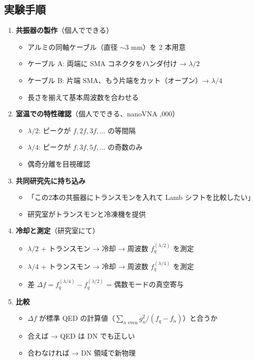 \documentclass[12pt,a4paper]{article}
\begin{document}
\subsection{実験手順}
\begin{expbox}[ステップバイステップ]
\begin{enumerate}
\item \textbf{共振器の製作}（個人でできる）
  \begin{itemize}
  \item アルミの同軸ケーブル（直径 $\sim$3 mm）を 2 本用意
  \item ケーブル A: 両端に SMA コネクタをハンダ付け → $\lambda/2$
  \item ケーブル B: 片端 SMA、もう片端をカット（オープン）→ $\lambda/4$
  \item 長さを揃えて基本周波数を合わせる
  \end{itemize}

\item \textbf{室温での特性確認}（個人でできる、nanoVNA ,000）
  \begin{itemize}
  \item $\lambda/2$: ピークが $f, 2f, 3f, \ldots$ の等間隔
  \item $\lambda/4$: ピークが $f, 3f, 5f, \ldots$ の奇数のみ
  \item 偶奇分離を目視確認
  \end{itemize}

\item \textbf{共同研究先に持ち込み}
  \begin{itemize}
  \item 「この2本の共振器にトランスモンを入れて Lamb シフトを比較したい」
  \item 研究室がトランスモンと冷凍機を提供
  \end{itemize}

\item \textbf{冷却と測定}（研究室にて）
  \begin{itemize}
  \item $\lambda/2$ + トランスモン → 冷却 → 周波数 $f_q^{(\lambda/2)}$ を測定
  \item $\lambda/4$ + トランスモン → 冷却 → 周波数 $f_q^{(\lambda/4)}$ を測定
  \item 差 $\Delta f = f_q^{(\lambda/4)} - f_q^{(\lambda/2)}$ = 偶数モードの真空寄与
  \end{itemize}

\item \textbf{比較}
  \begin{itemize}
  \item $\Delta f$ が標準 QED の計算値（$\sum_{n\text{ even}} g_n^2/(f_q - f_n)$）と合うか
  \item 合えば → QED は DN でも正しい
  \item 合わなければ → DN 領域で新物理
  \end{itemize}
\end{enumerate}
\end{expbox}
\end{document}
